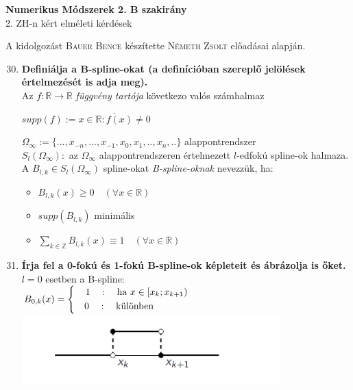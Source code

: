 \documentclass{article}
\begin{document}
\renewcommand{\labelitemi}{\textbullet}
\def\R{\mathbb{R}}
\def\N{\mathbb{N}}
\def\Z{\mathbb{Z}}
\def\C{\mathbb{C}}
\def\rtr{\R\to\R}
\def\ab{[a;b]}
\def\intab{\int\limits_{a}^{b}}
\begin{center}
	{\Large\textbf{Numerikus Módszerek 2. B szakirány}}\\[0.2cm]	
	2. ZH-n kért elméleti kérdések	
\end{center}
{\small A kidolgozást \textsc{Bauer Bence} készítette \textsc{Németh Zsolt} előadásai alapján.}\\
\begin{enumerate}
	\setcounter{enumi}{29}
	\item\textbf{Definiálja a B-spline-okat (a definícióban szereplő jelölések értelmezését is adja meg).}\\[0.1cm]
	Az $f:\rtr$ \textit{függvény tartója} következo valós számhalmaz
	\begin{center}
		$supp(f):=\overline{x\in\R:f(x)\neq0}$
	\end{center}
	$\Omega_\infty:=\{...,x_{-n},...,x_{-1},x_0,x_1,..,x_n,..\}$ alappontrendszer \\[0.2cm]
	$S_l(\Omega_\infty):$ az $\Omega_\infty$ alappontrendszeren értelmezett $l$-edfokú spline-ok halmaza.\\[0.2cm]
	A $B_{l,k}\in S_l(\Omega_\infty)$ spline-okat \textit{B-spline-oknak} nevezzük, ha:
	\begin{itemize}
		\item $B_{l,k}(x)\geq0\quad(\forall x\in\R)$
		\item $supp(B_{l,k})$ minimális
		\item $\sum\limits_{k\in\Z}B_{l,k}(x)\equiv1\quad(\forall x\in\R)$
	\end{itemize}
	\item\textbf{Írja fel a 0-fokú és 1-fokú B-spline-ok képleteit és ábrázolja is őket.}\\[0.1cm]
	$l=0$ esetben a B-spline:\\[0.2cm]
	$\displaystyle B_{0,k}(x)= 
	\left\{
	\begin{gathered}
	\quad 1\quad:\quad\text{ha }x\in[x_k;x_{k+1})\hspace{5.7cm} \\
	\quad 0\quad:\quad\text{különben}\hspace{7cm}
	\end{gathered}\right.$\\
	\includegraphics[width=10cm]{images/bspline0.png}\\

\end{enumerate}
\end{document}
